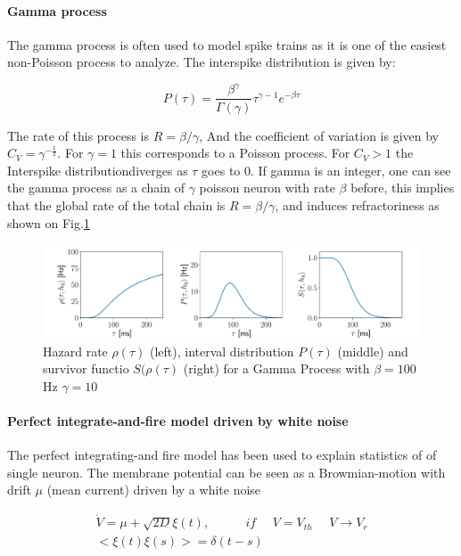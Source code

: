 \documentclass[a4paper,11pt,twoside]{article}
\numberwithin{equation}{section}
\begin{document}
\paragraph{Gamma process}

The gamma process is often used to model spike trains as it is one of the easiest non-Poisson process to analyze. The interspike distribution is given by:

\begin{equation}
\label{eq:gamma}
P(\tau)=\frac{\beta^\gamma}{\Gamma(\gamma)}\tau^{\gamma-1}e^{-\beta\tau}
\end{equation}

The rate of this process  is $R=\beta/\gamma$, And the coefficient of variation is given by $C_V=\gamma^{-\frac{1}{2}}$. For $\gamma=1$ this corresponds to a Poisson process. For $C_V>1$ the Interspike distributiondiverges as $\tau$ goes to $0$. If gamma is an integer, one can see the gamma process as a chain of $\gamma$ poisson neuron with rate $\beta$ before, this implies that the global rate of the total chain is $R=\beta/\gamma$, and induces refractoriness as shown on Fig.\ref{fig:gammaprocess}


\begin{figure}
	\includegraphics[width=\linewidth]{gamma.pdf}
	\caption{Hazard rate $\rho(\tau)$ (left), interval distribution $P(\tau)$ (middle) and survivor functio $S(\rho(\tau)$ (right) for a Gamma Process with $\beta=100$ Hz
		$\gamma=10$ }
	\label{fig:gammaprocess}
\end{figure}

\paragraph{Perfect integrate-and-fire model driven by white noise}
\label{sec:pif}
The perfect integrating-and fire model has been used  to explain statistics of of single neuron. The membrane potential can be seen as a Browmian-motion with drift $\mu$ (mean current) driven by a white noise


\begin{align}
\label{eq:Vxi}
\dot V=\mu +\sqrt{2D}\xi(t), \:\:\:\:\:\:\:\: \:\:\:\:\: if\:\:\:\:\:\:  V=V_{th}\:\:\:\:\:\:V\rightarrow V_r\\ 
<\xi(t)\xi(s)>=\delta(t-s)
\end{align}
\end{document}

